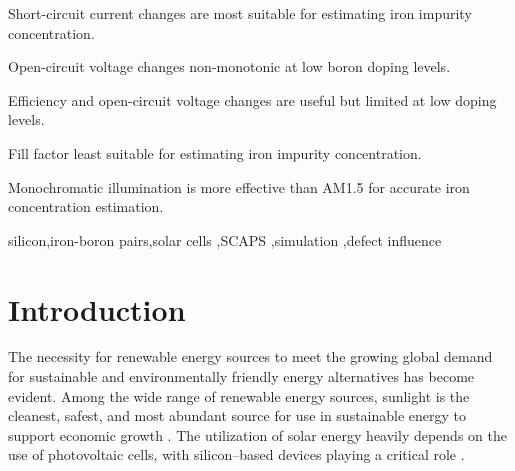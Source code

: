 \documentclass[a4paper,fleqn]{cas-sc}
\begin{document}

\begin{highlights}
\item Short-circuit current changes are most suitable for estimating iron impurity concentration.
\item Open-circuit voltage changes non-monotonic at low boron doping levels.
\item Efficiency and open-circuit voltage changes are useful but limited at low doping levels.
\item Fill factor least suitable for estimating iron impurity concentration.
\item Monochromatic illumination is more effective than AM1.5 for accurate iron concentration estimation.
\end{highlights}



\begin{keywords}
 silicon\sep iron-boron pairs\sep solar cells \sep SCAPS \sep simulation \sep defect influence
\end{keywords}

\maketitle

\section{Introduction}%
\par
The necessity for renewable energy sources to meet the growing global demand for sustainable and environmentally friendly energy alternatives has become evident.
Among the wide range of renewable energy sources, sunlight is the cleanest, safest,
and most abundant source for use in sustainable energy to support economic growth \cite{PratapSingh2019}.
The utilization of solar energy heavily depends on the use of photovoltaic cells, with silicon--based devices playing a critical role \cite{Basnet2024,Wang2024}.
\end{document}
